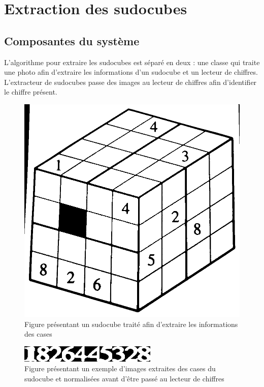 \section{Extraction des sudocubes}
\subsection{Composantes du système}
L'algorithme pour extraire les sudocubes est séparé en deux : une classe qui traite une photo afin d'extraire les informations d'un sudocube et un lecteur de chiffres. L'extracteur de sudocubes passe des images au lecteur de chiffres afin d'identifier le chiffre présent.

\begin{figure}[htbp]
\centering
\includegraphics[scale=0.25]{fig/sudocubeThreshold.png}
\caption{Figure présentant un sudocube traité afin d'extraire les informations des cases}
\label{fig:sudoThresh}
\end{figure}

\begin{figure}[htbp]
\centering
\includegraphics[scale=0.9]{fig/chiffresLues.png}
\caption{Figure présentant un exemple d'images extraites des cases du sudocube et normalisées avant d'être passé au lecteur de chiffres}
\label{fig:chifLu}
\end{figure}

